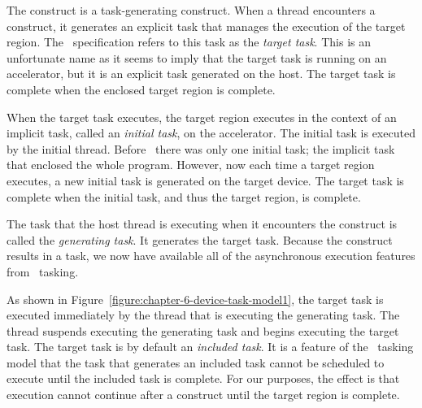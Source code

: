 The  construct is a task-generating construct.  When a thread
encounters a  construct, it generates an explicit task that
manages the execution of the target region.  The \OMPfourfive\ specification
refers to this task as the \emph{target task}.  This is an unfortunate name as
it seems to imply that the target task is running on an accelerator, but it
is an explicit task generated on the host.  The target task is complete when
the enclosed target region is complete.

When the target task executes, the target region executes in the context of an
implicit task, called an \emph{initial task}, on the accelerator.  The initial
task is executed by the initial thread.  Before \OMPfourzero\, there was only one
initial task; the implicit task that enclosed the whole program.  However, now each
time a target region executes, a new initial task is generated on the target
device.  The target task is complete when the initial task, and thus the target
region, is complete.

The task that the host thread is executing when it encounters the 
construct is called the \emph{generating task}.  It generates the target task.
Because the  construct results in a task, we now have available
all of the asynchronous execution features from \OMP\ tasking.

\begin{figure*}[!tb]
\centering
{}
\caption{ \textbf{The target task as an included task} -- \small
        By default, the target task is an included task.  The
        generating task cannot resume until the included target
        task is complete.  The target task completes when the
        implicit task that contains the target region is completed
        by the initial thread running on an accelerator.
        }
\label{figure:chapter-6-device-task-model1}
\end{figure*}

As shown in Figure~\ref{figure:chapter-6-device-task-model1}, the target
task is executed immediately by the thread that is executing the generating
task.  The thread suspends executing the generating task and begins executing
the target task.  The target task is by default an \emph{included task}.  It is
a feature of the \OMP\ tasking model that the task that generates an included
task cannot be scheduled to execute until the included task is complete.  For
our purposes, the effect is that execution cannot continue after a
 construct until the target region is complete.

